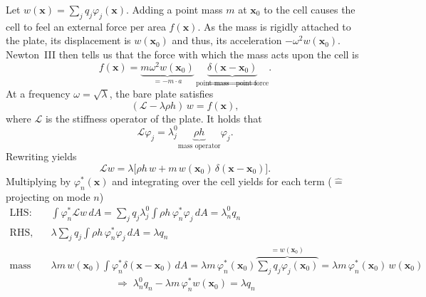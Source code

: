 Let $w(\mathbf{x}) = \sum_j q_j \varphi_j(\mathbf{x})$. Adding a point mass $m$
at $\mathbf{x}_0$ to the cell causes the cell to feel an external force per
area $f(\mathbf{x})$. As the mass is rigidly attached to the plate, its
displacement is $w(\mathbf{x}_0)$ and thus, its acceleration
$-\omega^2 w(\mathbf{x}_0)$. Newton~III then tells us that the force with which
the mass acts upon the cell is
\begin{equation}
  f(\mathbf{x}) = \underbrace{m\omega^2 w(\mathbf{x}_0)}_{= -m\cdot a}\,
  \underbrace{\delta(\mathbf{x} - \mathbf{x}_0)}_{\text{point mass} \Rightarrow \text{point force}} .
\end{equation}
At a frequency $\omega = \sqrt{\lambda}$, the bare plate satisfies
\begin{equation}
  (\mathcal{L} - \lambda\rho h)\, w = f(\mathbf{x}) ,
\end{equation}
where $\mathcal{L}$ is the stiffness operator of the plate. It holds that
\begin{equation}
  \mathcal{L}\varphi_j = \lambda_j^0 \underbrace{\rho h}_{\text{mass operator}} \varphi_j .
\end{equation}
Rewriting yields
\begin{equation}
  \mathcal{L} w = \lambda\bigl[\rho h\, w + m\, w(\mathbf{x}_0)\,\delta(\mathbf{x} - \mathbf{x}_0)\bigr] .
\end{equation}
Multiplying by $\varphi_n^*(\mathbf{x})$ and integrating over the cell yields for
each term ($\mathrel{\widehat{=}}$ projecting on mode $n$)
\begin{equation}
\begin{aligned}
  \text{LHS:}\quad & \int \varphi_n^* \mathcal{L} w \, dA
    = \sum_j q_j \lambda_j^0 \int \rho h\, \varphi_n^* \varphi_j \, dA = \lambda_n^0 q_n \\
  \text{RHS, plate term:}\quad & \lambda \sum_j q_j \int \rho h\, \varphi_n^* \varphi_j \, dA = \lambda q_n \\
  \text{mass term:}\quad & \lambda m\, w(\mathbf{x}_0) \int \varphi_n^* \delta(\mathbf{x} - \mathbf{x}_0)\, dA
    = \lambda m\, \varphi_n^*(\mathbf{x}_0) \overbrace{\sum_j q_j \varphi_j(\mathbf{x}_0)}^{= w(\mathbf{x}_0)}
    = \lambda m\, \varphi_n^*(\mathbf{x}_0)\, w(\mathbf{x}_0)
\end{aligned}
\end{equation}
\begin{equation}
  \Rightarrow\; \lambda_n^0 q_n - \lambda m\, \varphi_n^* w(\mathbf{x}_0) = \lambda q_n
  \label{eq:modal_projection}
\end{equation}

